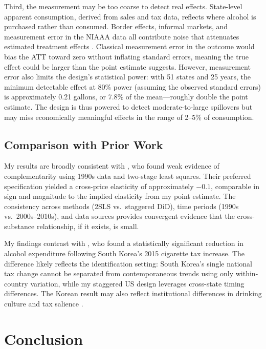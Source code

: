 \documentclass[12pt]{article}
\begin{document}
Third, the measurement may be too coarse to detect real effects. State-level apparent consumption, derived from sales and tax data, reflects where alcohol is purchased rather than consumed. Border effects, informal markets, and measurement error in the NIAAA data all contribute noise that attenuates estimated treatment effects \citep{kenkel2005are}. Classical measurement error in the outcome would bias the ATT toward zero without inflating standard errors, meaning the true effect could be larger than the point estimate suggests. However, measurement error also limits the design's statistical power: with 51 states and 25 years, the minimum detectable effect at 80\% power (assuming the observed standard errors) is approximately 0.21 gallons, or 7.8\% of the mean---roughly double the point estimate. The design is thus powered to detect moderate-to-large spillovers but may miss economically meaningful effects in the range of 2--5\% of consumption.

\subsection{Comparison with Prior Work}

My results are broadly consistent with \citet{decker2000cigarettes}, who found weak evidence of complementarity using 1990s data and two-stage least squares. Their preferred specification yielded a cross-price elasticity of approximately $-0.1$, comparable in sign and magnitude to the implied elasticity from my point estimate. The consistency across methods (2SLS vs.\ staggered DiD), time periods (1990s vs.\ 2000s--2010s), and data sources provides convergent evidence that the cross-substance relationship, if it exists, is small.

My findings contrast with \citet{yu2023cigarette}, who found a statistically significant reduction in alcohol expenditure following South Korea's 2015 cigarette tax increase. The difference likely reflects the identification setting: South Korea's single national tax change cannot be separated from contemporaneous trends using only within-country variation, while my staggered US design leverages cross-state timing differences. The Korean result may also reflect institutional differences in drinking culture and tax salience \citep{chetty2009salience}.


\section{Conclusion}
\end{document}
